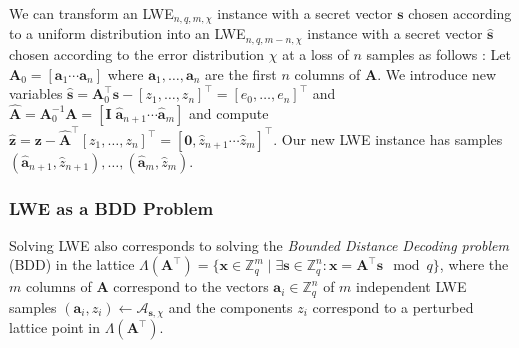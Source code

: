 We can transform an LWE$_{n, q, m, \chi}$ instance with a secret vector $\mathbf{s}$ chosen according to a uniform distribution into an LWE$_{n, q, m-n, \chi}$ instance with a secret vector $\hat{\mathbf{s}}$ chosen according to the error distribution $\chi$ at a loss of $n$ samples as follows \cite{GJS15}: Let $\mathbf{A}_0 = \left[ \mathbf{a}_1 \cdots \mathbf{a}_n\right]$ where $\mathbf{a}_1, \ldots, \mathbf{a}_n$ are the first $n$ columns of $\mathbf{A}$. We introduce new variables $\hat{\mathbf{s}} = \mathbf{A}^\intercal_0 \mathbf{s}  - \left[z_1, \ldots, z_n\right]^\intercal = \left[e_0, \ldots, e_n\right]^\intercal$ and $\hat{\mathbf{A}} = \mathbf{A}_0^{-1} \mathbf{A} = \left[\mathbf{I} \; \hat{\mathbf{a}}_{n+1} \cdots \hat{\mathbf{a}}_{m}\right]$ and compute $\hat{\mathbf{z}} = \mathbf{z} -  \hat{\mathbf{A}}^\intercal \left[z_1, \ldots, z_n\right]^\intercal  = \left[\mathbf{0}, \hat{z}_{n+1} \cdots \hat{z}_{m} \right]^\intercal$. Our new LWE instance has samples $(\hat{\mathbf{a}}_{n+1}, \hat{z}_{n+1}), \dots, (\hat{\mathbf{a}}_{m}, \hat{z}_{m})$. \label{sec:lwe-transform-distro}


\subsubsection{LWE as a BDD Problem} \label{sec:lwe-bdd} %
Solving LWE also corresponds to solving the \textit{Bounded Distance Decoding problem} (BDD) in the lattice $\Lambda(\mathbf{A}^\intercal) = \{ \mathbf{x} \in \mathbb{Z}_q^m \mid \exists \mathbf{s} \in \mathbb{Z}_q^n : \mathbf{x} = \mathbf{A}^\intercal \mathbf{s}  \mod q \}$, where the $m$ columns of $\mathbf{A}$ correspond to the vectors $\mathbf{a}_i \in \mathbb{Z}_q^n$ of $m$ independent LWE samples $(\mathbf{a}_i, z_i) \leftarrow \mathcal{A}_{\mathbf{s}, \chi}$ and the components $z_i$ correspond to a perturbed lattice point in $\Lambda(\mathbf{A}^\intercal)$. %


